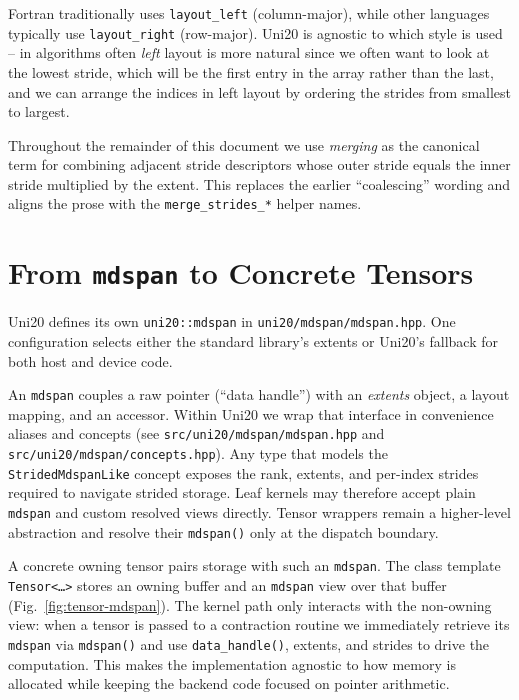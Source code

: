 \documentclass[11pt]{article}
\begin{document}
Fortran traditionally uses \texttt{layout\_left} (column-major), while other languages typically use \texttt{layout\_right}
(row-major). Uni20 is agnostic to which style is used -- in algorithms often \emph{left} layout is more natural since
we often want to look at the lowest stride, which will be the first entry in the array rather than the last, and we can
arrange the indices in left layout by ordering the strides from smallest to largest.

Throughout the remainder of this document we use \emph{merging} as the canonical term for combining
adjacent stride descriptors whose outer stride equals the inner stride multiplied by the extent.
This replaces the earlier ``coalescing'' wording and aligns the prose with the
\texttt{merge\_strides\_*} helper names.

\section{From \texttt{mdspan} to Concrete Tensors}
Uni20 defines its own \texttt{uni20::mdspan} in
\texttt{uni20/mdspan/mdspan.hpp}. One configuration selects either the standard
library's extents or Uni20's fallback for both host and device code.

An \texttt{mdspan} couples a
raw pointer (``data handle'') with an \emph{extents} object, a layout mapping, and an accessor.
Within Uni20 we wrap that interface in convenience aliases and concepts (see
\texttt{src/uni20/mdspan/mdspan.hpp} and
\texttt{src/uni20/mdspan/concepts.hpp}). Any type that models the
\texttt{StridedMdspanLike} concept exposes the rank, extents, and per-index strides
required to navigate strided storage. Leaf kernels may therefore accept plain
\texttt{mdspan} and custom resolved views directly. Tensor wrappers remain a
higher-level abstraction and resolve their \texttt{mdspan()} only at the
dispatch boundary.

A concrete owning tensor pairs storage with such an \texttt{mdspan}.  The class template
\texttt{Tensor<\ldots>} stores an owning buffer and an \texttt{mdspan} view over that buffer
(Fig.~\ref{fig:tensor-mdspan}).  The kernel path only interacts with the non-owning view: when a
tensor is passed to a contraction routine we immediately retrieve its \texttt{mdspan} via
\texttt{mdspan()} and use \texttt{data\_handle()}, extents, and strides to drive the computation.
This makes the implementation agnostic to how memory is allocated while keeping the backend code
focused on pointer arithmetic.
\end{document}

